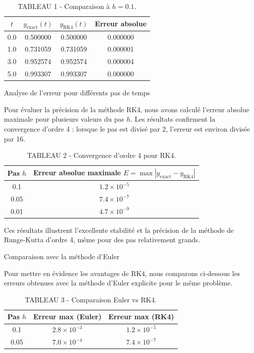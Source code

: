 \documentclass[12pt,a4paper]{article}
\begin{document}
\begin{table}[h]
\centering
\begin{tabular}{cccc}
\toprule
$t$ & $y_{\text{exact}}(t)$ & $y_{\text{RK4}}(t)$ & Erreur absolue \\
\midrule
0.0 & 0.500000 & 0.500000 & 0.000000 \\
1.0 & 0.731059 & 0.731059 & 0.000001 \\
3.0 & 0.952574 & 0.952574 & 0.000004 \\
5.0 & 0.993307 & 0.993307 & 0.000000 \\
\bottomrule
\end{tabular}
\caption{TABLEAU 1 - Comparaison à $h=0.1$.}
\end{table}

\vspace{1em}

Analyse de l’erreur pour différents pas de temps

Pour évaluer la précision de la méthode RK4, nous avons calculé l’erreur absolue maximale pour plusieurs valeurs du pas $h$. Les résultats confirment la convergence d’ordre 4 : lorsque le pas est divisé par 2, l’erreur est environ divisée par 16.

\begin{table}[h]
\centering
\begin{tabular}{cc}
\toprule
Pas $h$ & Erreur absolue maximale $E = \max |y_{\text{exact}} - y_{\text{RK4}}|$ \\
\midrule
0.1 & $1.2 \times 10^{-5}$ \\
0.05 & $7.4 \times 10^{-7}$ \\
0.01 & $4.7 \times 10^{-9}$ \\
\bottomrule
\end{tabular}
\caption{TABLEAU 2 - Convergence d'ordre 4 pour RK4.}
\end{table}

Ces résultats illustrent l’excellente stabilité et la précision de la méthode de Runge-Kutta d’ordre 4, même pour des pas relativement grands.

Comparaison avec la méthode d’Euler

Pour mettre en évidence les avantages de RK4, nous comparons ci-dessous les erreurs obtenues avec la méthode d’Euler explicite pour le même problème.

\begin{table}[h]
\centering
\begin{tabular}{ccc}
\toprule
Pas $h$ & Erreur max (Euler) & Erreur max (RK4) \\
\midrule
0.1 & $2.8 \times 10^{-3}$ & $1.2 \times 10^{-5}$ \\
0.05 & $7.0 \times 10^{-4}$ & $7.4 \times 10^{-7}$ \\
\bottomrule
\end{tabular}
\caption{TABLEAU 3 - Comparaison Euler vs RK4.}
\end{table}
\end{document}
